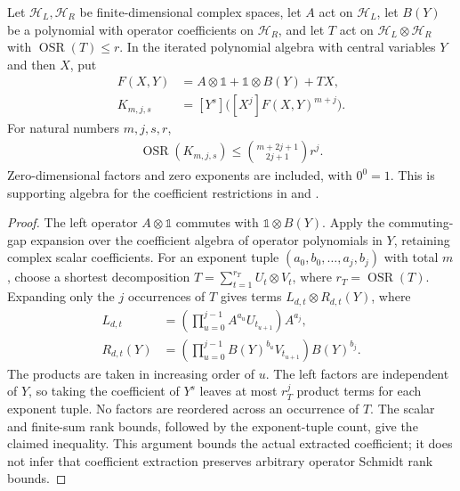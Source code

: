 \begin{theorem}
    \label{thm:local_polynomial_coefficient_rank}
    \leanok
    Let $\mathcal H_L,\mathcal H_R$ be finite-dimensional complex spaces,
    let $A$ act on $\mathcal H_L$, let $B(Y)$ be a polynomial with operator
    coefficients on $\mathcal H_R$, and let $T$ act on
    $\mathcal H_L\otimes\mathcal H_R$ with $\operatorname{OSR}(T)\le r$.
    In the iterated polynomial algebra with central variables $Y$ and then $X$, put
    \begin{align*}
        F(X,Y)&=A\otimes\mathbb 1+\mathbb 1\otimes B(Y)+TX, \\
        K_{m,j,s}&=[Y^s]\bigl([X^j]F(X,Y)^{m+j}\bigr).
    \end{align*}
    For natural numbers $m,j,s,r$,
    \begin{align*}
        \operatorname{OSR}(K_{m,j,s})
            \le\binom{m+2j+1}{2j+1}r^j.
    \end{align*}
    Zero-dimensional factors and zero exponents are included, with $0^0=1$.
    This is supporting algebra for the coefficient restrictions in
    \cite[Lemma~4.2]{Arad2013AreaLaw} and
    \cite[Proposition~5.7]{Arad2016RigorousRG}.
\end{theorem}
\begin{proof}
    \leanok
    The left operator $A\otimes\mathbb 1$ commutes with
    $\mathbb 1\otimes B(Y)$. Apply the commuting-gap expansion over the
    coefficient algebra of operator polynomials in $Y$, retaining complex
    scalar coefficients. For an exponent tuple $(a_0,b_0,\ldots,a_j,b_j)$
    with total $m$, choose a shortest decomposition
    $T=\sum_{t=1}^{r_T}U_t\otimes V_t$, where $r_T=\operatorname{OSR}(T)$.
    Expanding only the $j$ occurrences of $T$ gives terms
    $L_{d,t}\otimes R_{d,t}(Y)$, where
    \begin{align*}
        L_{d,t}&=\left(\prod_{u=0}^{j-1}A^{a_u}U_{t_{u+1}}\right)A^{a_j}, \\
        R_{d,t}(Y)&=\left(\prod_{u=0}^{j-1}B(Y)^{b_u}V_{t_{u+1}}\right)B(Y)^{b_j}.
    \end{align*}
    The products are taken in increasing order of $u$.
    The left factors are independent of $Y$, so taking the coefficient of
    $Y^s$ leaves at most $r_T^j$ product terms for each exponent tuple.
    No factors are reordered across an occurrence of $T$.
    The scalar and finite-sum rank bounds, followed by the exponent-tuple
    count, give the claimed inequality. This argument bounds the actual
    extracted coefficient; it does not infer that coefficient extraction
    preserves arbitrary operator Schmidt rank bounds.
\end{proof}


